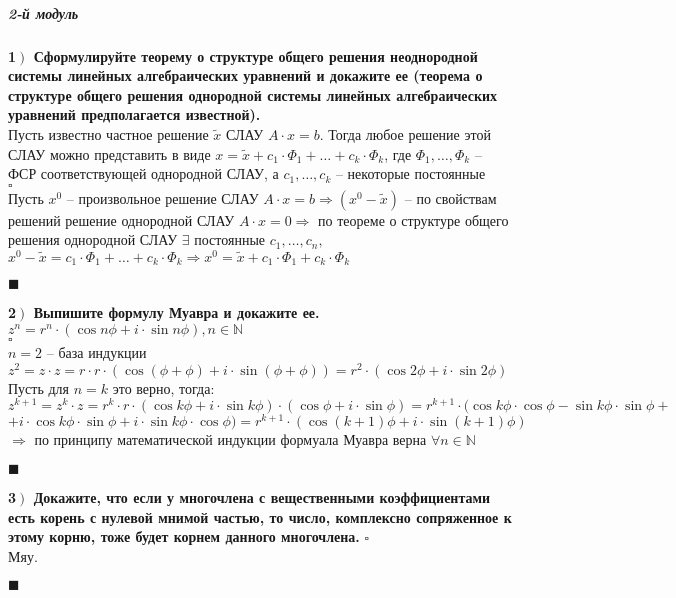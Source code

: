 \documentclass[a4paper,12pt]{article}
\begin{document}
    \subparagraph{2-й модуль}

    \textbf{1$\left.\right)$ Сформулируйте теорему о структуре общего решения неоднородной системы линейных алгебраических уравнений и докажите ее (теорема о структуре общего решения однородной системы линейных алгебраических уравнений предполагается известной).}\\
    Пусть известно частное решение $\tilde x$ СЛАУ $A\cdot x=b$. Тогда любое решение этой СЛАУ можно представить в виде $x=\tilde x+c_1\cdot\Phi_1+\ldots+c_k\cdot\Phi_k$, где $\Phi_1,\ldots, \Phi_k$ -- ФСР соответствующей однородной СЛАУ, а $c_1, \ldots, c_k$ -- некоторые постоянные\\
    $\square$\\
    Пусть $x^0$ -- произвольное решение СЛАУ $A\cdot x=b\Rightarrow(x^0-\tilde x)$ -- по свойствам решений решение однородной СЛАУ $A\cdot x=0\Rightarrow$ по теореме о структуре общего решения однородной СЛАУ $\exists$ постоянные $c_1, \ldots, c_n,$\\$ x^0-\tilde x=c_1\cdot\Phi_1+\ldots+c_k\cdot\Phi_k\Rightarrow x^0=\tilde x+c_1\cdot\Phi_1+c_k\cdot\Phi_k$
    \begin{flushright}
        $\blacksquare$
    \end{flushright}

    \textbf{2$\left.\right)$ Выпишите формулу Муавра и докажите ее.}\\$z^n=r^n\cdot(\cos n\phi+i\cdot\sin n\phi), n\in\mathbb{N}$\\
    $\square$\\
    $n=2$ -- база индукции\\
    $z^2=z\cdot z=r\cdot r\cdot(\cos(\phi+\phi)+i\cdot\sin(\phi+\phi))=r^2\cdot(\cos2\phi+i\cdot\sin2\phi)$\\
    Пусть для $n=k$ это верно, тогда:\\
    $z^{k+1}=z^k\cdot z=r^k\cdot r\cdot(\cos k\phi+i\cdot\sin k\phi)\cdot(\cos\phi+i\cdot\sin\phi)=r^{k+1}\cdot(\cos k\phi\cdot\cos\phi-\sin k\phi\cdot\sin\phi+$\\$+i\cdot\cos k\phi\cdot\sin\phi+i\cdot\sin k\phi\cdot\cos\phi)=r^{k+1}\cdot(\cos(k+1)\phi+i\cdot\sin(k+1)\phi)$\\
    $\Rightarrow$ по принципу математической индукции формуала Муавра верна $\forall n\in\mathbb{N}$
    \begin{flushright}
        $\blacksquare$
    \end{flushright}

    \textbf{3$\left.\right)$ Докажите, что если у многочлена с вещественными коэффициентами есть корень с нулевой мнимой частью, то число, комплексно сопряженное к этому корню, тоже будет корнем данного многочлена.}
    $\square$\\
    Мяу.
    \begin{flushright}
        $\blacksquare$
    \end{flushright}
\end{document}
